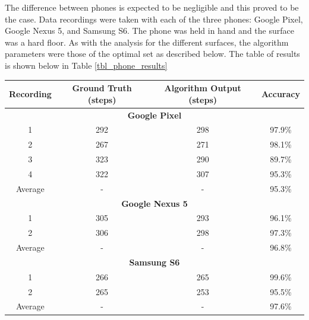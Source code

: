                 The difference between phones is expected to be negligible and this proved to be the case. Data recordings were taken with each of the three phones: Google Pixel, Google Nexus 5, and Samsung S6. The phone was held in hand and the surface was a hard floor. As with the analysis for the different surfaces, the algorithm parameters were those of the optimal set as described below. The table of results is shown below in Table \ref{tbl_phone_results}

                \begin{center}
                    \label{tbl_phone_results}
                    \begin{tabular}{|c|c|c|c|}
                        \hline
                        Recording & Ground Truth (steps) & Algorithm Output (steps) & Accuracy \\
                        \hline
                        \multicolumn{4}{|c|}{\textbf{Google Pixel}} \\
                        \hline
                        1 & 292 & 298 & 97.9\% \\
                        2 & 267 & 271 & 98.1\% \\
                        3 & 323 & 290 & 89.7\% \\
                        4 & 322 & 307 & 95.3\% \\
                        \hline
                        Average & - & - & 95.3\% \\
                        \hline
                        \multicolumn{4}{|c|}{\textbf{Google Nexus 5}} \\                        
                        \hline
                        1 & 305 & 293 & 96.1\% \\
                        2 & 306 & 298 & 97.3\% \\
                        \hline
                        Average & - & - & 96.8\%\\
                        \hline
                        \multicolumn{4}{|c|}{\textbf{Samsung S6}} \\                        
                        \hline
                        1 & 266 & 265 & 99.6\% \\
                        2 & 265 & 253 & 95.5\% \\
                        \hline
                        Average & - & - & 97.6\% \\
                        \hline
                    \end{tabular}
                \end{center}

